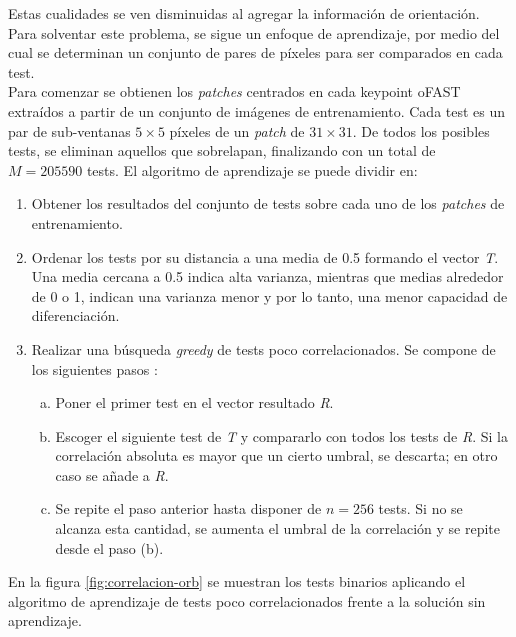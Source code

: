 Estas cualidades se ven disminuidas al agregar la información de orientación. Para solventar este problema, se sigue un enfoque de aprendizaje, por medio del cual se determinan un conjunto de pares de píxeles para ser comparados en cada test. \\
Para comenzar se obtienen los \textit{patches} centrados en cada keypoint oFAST extraídos a partir de un conjunto de imágenes de entrenamiento. Cada test es un par de sub-ventanas $5 \times 5$ píxeles de un \textit{patch} de $31 \times 31$. De todos los posibles tests, se eliminan aquellos que sobrelapan, finalizando con un total de $M = 205590$ tests.
El algoritmo de aprendizaje se puede dividir en:

\begin{enumerate}

\item Obtener los resultados del conjunto de tests sobre cada uno de los \textit{patches} de entrenamiento.

\item Ordenar los tests por su distancia a una media de 0.5 formando el vector \textit{T}. Una media cercana a 0.5 indica alta varianza, mientras que medias alrededor de 0 o 1, indican una varianza menor y por lo tanto, una menor capacidad de diferenciación.

\item Realizar una búsqueda \textit{greedy} de tests poco correlacionados. Se compone de los siguientes pasos :
\begin{enumerate} [a)]
\item Poner el primer test en el vector resultado \textit{R}.

\item Escoger el siguiente test de \textit{T} y compararlo con todos los tests de \textit{R}. Si la correlación absoluta es mayor que un cierto umbral, se descarta; en otro caso se añade a \textit{R}.

\item Se repite el paso anterior hasta disponer de $n = 256$ tests. Si no se alcanza esta cantidad, se aumenta el umbral de la correlación y se repite desde el paso (b).
\end{enumerate}

\end{enumerate}

En la figura \ref{fig:correlacion-orb} se muestran los tests binarios aplicando el algoritmo de aprendizaje de tests poco correlacionados frente a la solución sin aprendizaje.

